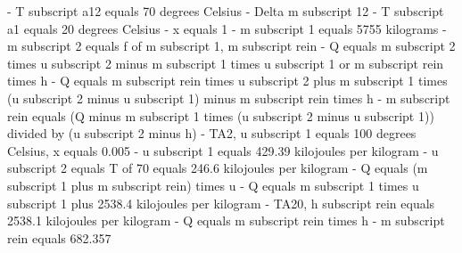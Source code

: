 - T subscript a12 equals 70 degrees Celsius
- Delta m subscript 12
- T subscript a1 equals 20 degrees Celsius
- x equals 1
- m subscript 1 equals 5755 kilograms
- m subscript 2 equals f of m subscript 1, m subscript rein
- Q equals m subscript 2 times u subscript 2 minus m subscript 1 times u subscript 1 or m subscript rein times h
- Q equals m subscript rein times u subscript 2 plus m subscript 1 times (u subscript 2 minus u subscript 1) minus m subscript rein times h
- m subscript rein equals (Q minus m subscript 1 times (u subscript 2 minus u subscript 1)) divided by (u subscript 2 minus h)
- TA2, u subscript 1 equals 100 degrees Celsius, x equals 0.005
- u subscript 1 equals 429.39 kilojoules per kilogram
- u subscript 2 equals T of 70 equals 246.6 kilojoules per kilogram
- Q equals (m subscript 1 plus m subscript rein) times u
- Q equals m subscript 1 times u subscript 1 plus 2538.4 kilojoules per kilogram
- TA20, h subscript rein equals 2538.1 kilojoules per kilogram
- Q equals m subscript rein times h
- m subscript rein equals 682.357